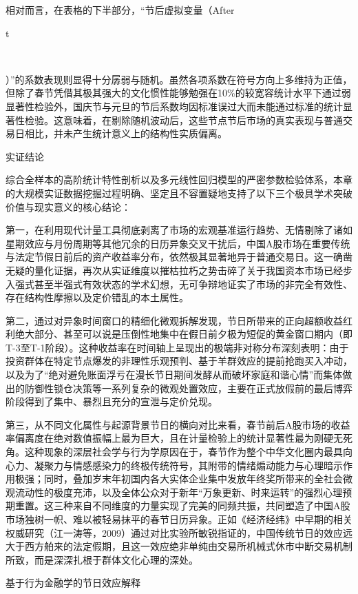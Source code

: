 \documentclass{cupb-thesis}
\begin{document}
相对而言，在表格的下半部分，“节后虚拟变量（After

t

​

）”的系数表现则显得十分孱弱与随机。虽然各项系数在符号方向上多维持为正值，但除了春节凭借其极其强大的文化惯性能够勉强在10\%的较宽容统计水平下通过弱显著性检验外，国庆节与元旦的节后系数均因标准误过大而未能通过标准的统计显著性检验。这意味着，在剔除随机波动后，这些节点节后市场的真实表现与普通交易日相比，并未产生统计意义上的结构性实质偏离。


实证结论

综合全样本的高阶统计特性剖析以及多元线性回归模型的严密参数检验体系，本章的大规模实证数据挖掘过程明确、坚定且不容置疑地支持了以下三个极具学术突破价值与现实意义的核心结论：


第一，在利用现代计量工具彻底剥离了市场的宏观基准运行趋势、无情剔除了诸如星期效应与月份周期等其他冗余的日历异象交叉干扰后，中国A股市场在重要传统与法定节假日前后的资产收益率分布，依然极其显著地异于普通交易日。这一确凿无疑的量化证据，再次从实证维度以摧枯拉朽之势击碎了关于我国资本市场已经步入强式甚至半强式有效状态的学术幻想，无可争辩地证实了市场的非完全有效性、存在结构性摩擦以及定价错乱的本土属性。


第二，通过对异象时间窗口的精细化微观拆解发现，节日所带来的正向超额收益红利绝大部分、甚至可以说是压倒性地集中在假日前夕极为短促的黄金窗口期内（即T-3至T-1阶段）。这种收益率在时间轴上呈现出的极端非对称分布深刻表明：由于投资群体在特定节点爆发的非理性乐观预判、基于羊群效应的提前抢跑买入冲动，以及为了“绝对避免账面浮亏在漫长节日期间发酵从而破坏家庭和谐心情”而集体做出的防御性锁仓决策等一系列复杂的微观处置效应，主要在正式放假前的最后博弈阶段得到了集中、暴烈且充分的宣泄与定价兑现。


第三，从不同文化属性与起源背景节日的横向对比来看，春节前后A股市场的收益率偏离度在绝对数值振幅上最为巨大，且在计量检验上的统计显著性最为刚硬无死角。这种现象的深层社会学与行为学原因在于，春节作为整个中华文化圈内最具向心力、凝聚力与情感感染力的终极传统符号，其附带的情绪煽动能力与心理暗示作用极强；同时，叠加岁末年初国内各大实体企业集中发放年终奖所带来的全社会微观流动性的极度充沛，以及全体公众对于新年“万象更新、时来运转”的强烈心理预期重置。这三种来自不同维度的力量实现了完美的同频共振，共同塑造了中国A股市场独树一帜、难以被轻易抹平的春节日历异象。正如《经济经纬》中早期的相关权威研究（江一涛等，2009）通过对比实验所敏锐指证的，中国传统节日的效应远大于西方舶来的法定假期，且这一效应绝非单纯由交易所机械式休市中断交易机制所致，而是深深扎根于群体文化心理的深处。


基于行为金融学的节日效应解释
\end{document}
